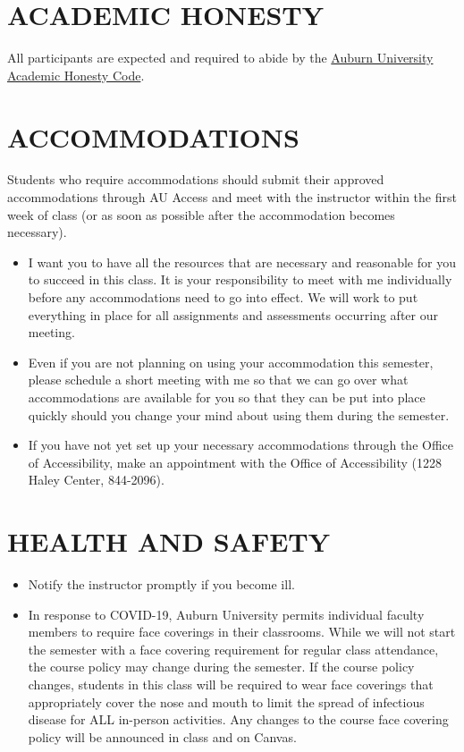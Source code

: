 \documentclass[12pt]{article}
\begin{document}
\section*{ACADEMIC HONESTY}
All participants are expected and required to abide by the \href{http://www.auburn.edu/academic/provost/academicHonesty.php}{Auburn University Academic Honesty Code}.

\section*{ACCOMMODATIONS}
Students who require accommodations should submit their approved accommodations through AU Access and meet with the instructor within the first week of class (or as soon as possible after the accommodation becomes necessary).

\begin{itemize}
    \item I want you to have all the resources that are necessary and reasonable for you to succeed in this class. It is your responsibility to meet with me individually before any accommodations need to go into effect. We will work to put everything in place for all assignments and assessments occurring after our meeting.
    \item Even if you are not planning on using your accommodation this semester, please schedule a short meeting with me so that we can go over what accommodations are available for you so that they can be put into place quickly should you change your mind about using them during the semester.
    \item If you have not yet set up your necessary accommodations through the Office of Accessibility, make an appointment with the Office of Accessibility (1228 Haley Center, 844-2096).
\end{itemize}

\section*{HEALTH AND SAFETY}
\begin{itemize}
    \item Notify the instructor promptly if you become ill.
    \item In response to COVID-19, Auburn University permits individual faculty members to require face coverings in their classrooms. While we will not start the semester with a face covering requirement for regular class attendance, the course policy may change during the semester. If the course policy changes, students in this class will be required to wear face coverings that appropriately cover the nose and mouth to limit the spread of infectious disease for ALL in-person activities. Any changes to the course face covering policy will be announced in class and on Canvas.
\end{itemize}
\end{document}
